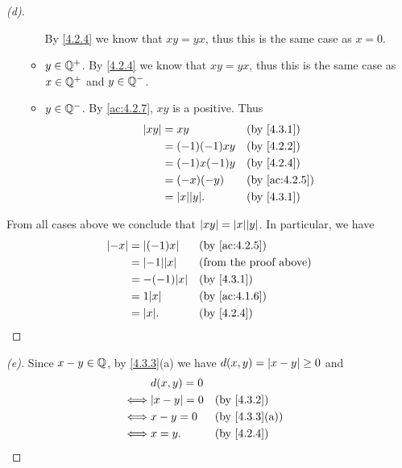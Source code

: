 \begin{proof}[(d)]
\begin{itemize}
\begin{itemize}
                  By \cref{4.2.4} we know that \(xy = yx\), thus this is the same case as \(x = 0\).
            \item \(y \in \mathbb{Q}^+\).
                  By \cref{4.2.4} we know that \(xy = yx\), thus this is the same case as \(x \in \mathbb{Q}^+\) and \(y \in \mathbb{Q}^-\).
            \item \(y \in \mathbb{Q}^-\).
                  By \cref{ac:4.2.7}, \(xy\) is a positive.
                  Thus
                  \begin{align*}
                    \abs{xy} & = xy               &  & \by{4.3.1}    \\
                             & = (-1)(-1)xy       &  & \by{4.2.2}    \\
                             & = (-1)x(-1)y       &  & \by{4.2.4}    \\
                             & = (-x)(-y)         &  & \by{ac:4.2.5} \\
                             & = \abs{x} \abs{y}. &  & \by{4.3.1}
                  \end{align*}
          \end{itemize}
  \end{itemize}
  From all cases above we conclude that \(\abs{xy} = \abs{x} \abs{y}\).
  In particular, we have
  \begin{align*}
    \abs{-x} & = \abs{(-1)x}      &  & \by{ac:4.2.5}                 \\
             & = \abs{-1} \abs{x} &  & \text{(from the proof above)} \\
             & = -(-1) \abs{x}    &  & \by{4.3.1}                    \\
             & = 1 \abs{x}        &  & \by{ac:4.1.6}                 \\
             & = \abs{x}.         &  & \by{4.2.4}
  \end{align*}
\end{proof}

\begin{proof}[(e)]
  Since \(x - y \in \mathbb{Q}\), by \cref{4.3.3}(a) we have \(d(x, y) = \left\lvert x - y\right\rvert \geq 0\) and
  \begin{align*}
         & d(x, y) = 0                        \\
    \iff & \abs{x - y} = 0 &  & \by{4.3.2}    \\
    \iff & x - y = 0       &  & \by{4.3.3}[a] \\
    \iff & x = y.          &  & \by{4.2.4}
  \end{align*}
\end{proof}

